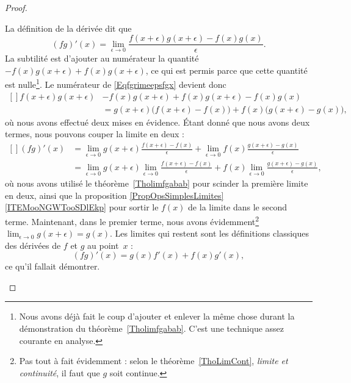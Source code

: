 \begin{proof}
\begin{subproof}
		La définition de la dérivée dit que
		\begin{equation}        \label{Eqfgrimeepsfgx}
			(fg)'(x)=\lim_{\epsilon\to 0}\frac{f(x+\epsilon)g(x+\epsilon)-f(x)g(x)}{\epsilon}.
		\end{equation}
		La subtilité est d'ajouter au numérateur la quantité \( -f(x)g(x+\epsilon)+f(x)g(x+\epsilon)\), ce qui est permis parce que cette quantité est nulle\footnote{Nous avons déjà fait le coup d'ajouter et enlever la même chose durant la démonstration du théorème~\ref{Tholimfgabab}. C'est une technique assez courante en analyse.}. Le numérateur de \eqref{Eqfgrimeepsfgx} devient donc
		\begin{equation}
			\begin{aligned}[]
				f(x+\epsilon)g(x+\epsilon) & -f(x)g(x+\epsilon)+f(x)g(x+\epsilon)-f(x)g(x)                                     \\
				                           & = g(x+\epsilon)\big( f(x+\epsilon)-f(x) \big)+f(x)\big( g(x+\epsilon)-g(x) \big),
			\end{aligned}
		\end{equation}
		où nous avons effectué deux mises en évidence. Étant donné que nous avons deux termes, nous pouvons couper la limite en deux :
		\begin{equation}
			\begin{aligned}[]
				(fg)'(x) & =\lim_{\epsilon\to 0}g(x+\epsilon)\frac{ f(x+\epsilon)-f(x) }{\epsilon}                      +  \lim_{\epsilon\to 0}f(x)\frac{ g(x+\epsilon)-g(x) }{\epsilon}  \\
				         & =\lim_{\epsilon\to 0}g(x+\epsilon)\lim_{\epsilon\to 0}\frac{ f(x+\epsilon)-f(x) }{\epsilon}  +  f(x)\lim_{\epsilon\to 0}\frac{ g(x+\epsilon)-g(x) }{\epsilon},
			\end{aligned}
		\end{equation}
		où nous avons utilisé le théorème~\ref{Tholimfgabab} pour scinder la première limite en deux, ainsi que la proposition \ref{PropOpsSimplesLimites}\ref{ITEMooNGWTooSDlEkp} pour sortir le \( f(x)\) de la limite dans le second terme. Maintenant, dans le premier terme, nous avons évidemment\footnote{Pas tout à fait évidemment : selon le théorème~\ref{ThoLimCont}, \emph{limite et continuité}, il faut que \( g\) soit continue.} \( \lim_{\epsilon\to 0}g(x+\epsilon)=g(x)\). Les limites qui restent sont les définitions classiques des dérivées de \( f\) et \( g\) au point~\( x\) :
		\begin{equation}
			(fg)'(x)=g(x)f'(x)+f(x)g'(x),
		\end{equation}
		ce qu'il fallait démontrer.


\end{subproof}
\end{proof}
